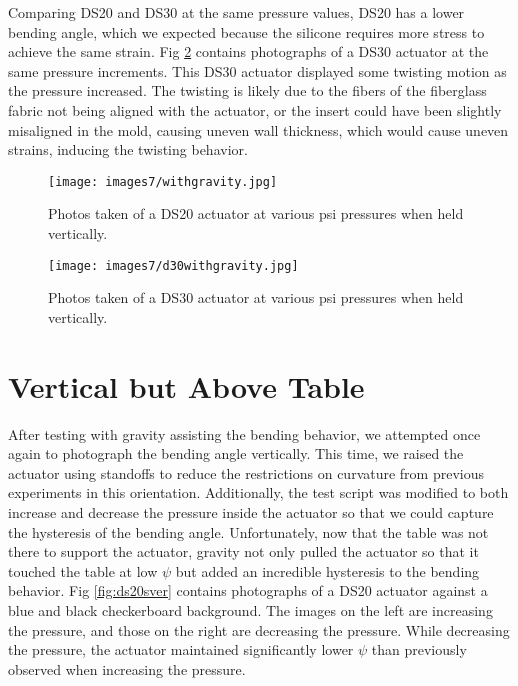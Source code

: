 Comparing DS20 and DS30 at the same pressure values, DS20 has a lower bending angle, which we expected because the silicone requires more stress to achieve the same strain. Fig \ref{fig:d30withgravity} contains photographs of a DS30 actuator at the same pressure increments. This DS30 actuator displayed some twisting motion as the pressure increased. The twisting is likely due to the fibers of the fiberglass fabric not being aligned with the actuator, or the insert could have been slightly misaligned in the mold, causing uneven wall thickness, which would cause uneven strains, inducing the twisting behavior.

\begin{figure}[!ht]
    \centering
     \texttt{[image: images7/withgravity.jpg]}
    \caption{Photos taken of a DS20 actuator at various psi pressures when held vertically.}
    \label{fig:withgravity}
\end{figure}

\begin{figure}[!ht]
    \centering
     \texttt{[image: images7/d30withgravity.jpg]}
    \caption{Photos taken of a DS30 actuator at various psi pressures when held vertically.}
    \label{fig:d30withgravity}
\end{figure}

\clearpage
\section{Vertical but Above Table}

After testing with gravity assisting the bending behavior, we attempted once again to photograph the bending angle vertically. This time, we raised the actuator using standoffs to reduce the restrictions on curvature from previous experiments in this orientation. Additionally, the test script was modified to both increase and decrease the pressure inside the actuator so that we could capture the hysteresis of the bending angle. Unfortunately, now that the table was not there to support the actuator, gravity not only pulled the actuator so that it touched the table at low $\psi$ but added an incredible hysteresis to the bending behavior. Fig \ref{fig:ds20sver} contains photographs of a DS20 actuator against a blue and black checkerboard background. The images on the left are increasing the pressure, and those on the right are decreasing the pressure. While decreasing the pressure, the actuator maintained significantly lower $\psi$ than previously observed when increasing the pressure. 

